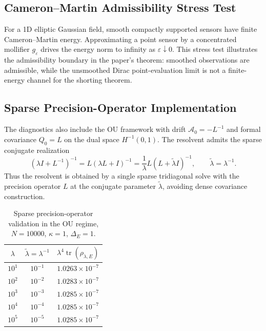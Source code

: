 \documentclass[11pt]{article}
\begin{document}
    \subsection{Cameron--Martin Admissibility Stress Test}
    \label{supp:cameron_martin_failure}

    For a 1D elliptic Gaussian field, smooth compactly supported sensors have finite
    Cameron--Martin energy. Approximating a point sensor by a concentrated
    mollifier $g_\varepsilon$ drives the energy norm to infinity as
    $\varepsilon\downarrow0$. This stress test illustrates the admissibility
    boundary in the paper's theorem: smoothed observations are admissible, while
    the unsmoothed Dirac point-evaluation limit is not a finite-energy channel for
    the shorting theorem.

    \subsection{Sparse Precision-Operator Implementation}
    \label{supp:sparse_precision}

    The diagnostics also include the OU framework with drift
    $\mathcal{A}_0=-L^{-1}$ and formal covariance $Q_0=L$ on the dual space
    $H^{-1}(0,1)$. The resolvent admits the sparse conjugate realization
    \[
    (\lambda I+L^{-1})^{-1}
    =L(\lambda L+I)^{-1}
    =
    \frac{1}{\lambda}L(L+\tilde{\lambda}I)^{-1},
    \qquad
    \tilde{\lambda}=\lambda^{-1}.
    \]
    Thus the resolvent is obtained by a single sparse tridiagonal solve with the
    precision operator $L$ at the conjugate parameter $\tilde{\lambda}$, avoiding
    dense covariance construction.

    \begin{table}[htbp]
        \centering
        \caption{Sparse precision-operator validation in the OU regime, $N=10000$,
        $\kappa=1$, $\Delta_E=1$.}
        \label{tab:supp_sparse_precision}
        \begin{tabular}{ccc}
            \toprule
            $\lambda$ & $\tilde{\lambda}=\lambda^{-1}$ &
            $\lambda^4\operatorname{tr}(\rho_{\lambda,E})$ \\
            \midrule
            $10^1$ & $10^{-1}$ & $1.0263\times10^{-7}$ \\
            $10^2$ & $10^{-2}$ & $1.0283\times10^{-7}$ \\
            $10^3$ & $10^{-3}$ & $1.0285\times10^{-7}$ \\
            $10^4$ & $10^{-4}$ & $1.0285\times10^{-7}$ \\
            $10^5$ & $10^{-5}$ & $1.0285\times10^{-7}$ \\
            \bottomrule
        \end{tabular}
    \end{table}
\end{document}

